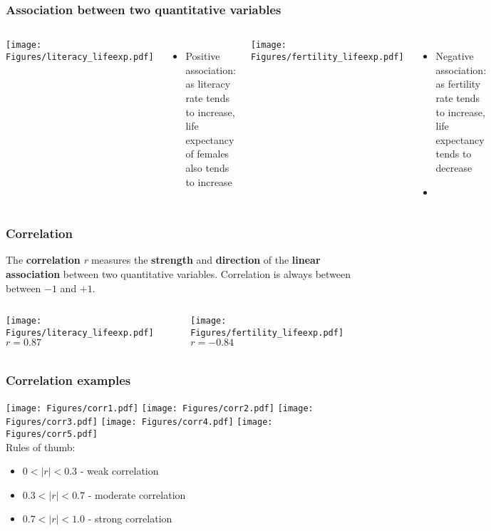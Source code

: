 \begin{frame}
\frametitle{Association between two quantitative variables}
\begin{columns}
\texttt{[image: Figures/literacy\_lifeexp.pdf]}\\
\begin{itemize}
    \item
    Positive association: as literacy rate tends to increase, life expectancy of females also tends to increase
\end{itemize}
\texttt{[image: Figures/fertility\_lifeexp.pdf]}\\
\begin{itemize}
    \item
    Negative association: as fertility rate tends to increase, life expectancy tends to decrease
    \item[]
\end{itemize}
\end{columns}
\end{frame}

\begin{frame}
\frametitle{Correlation}
The \textbf{correlation} \emph{r} measures the \textbf{strength} and \textbf{direction} of the \textbf{linear association} between two quantitative variables.  Correlation is always between between $-1$ and $+1$.
\begin{columns}
\begin{center}
\texttt{[image: Figures/literacy\_lifeexp.pdf]}\\
    $r=0.87$
\end{center}
\begin{center}
\texttt{[image: Figures/fertility\_lifeexp.pdf]}\\
    $r=-0.84$
\end{center}
\end{columns}
\end{frame}



\begin{frame}
\frametitle{Correlation examples}
\texttt{[image: Figures/corr1.pdf]}
\texttt{[image: Figures/corr2.pdf]}
\texttt{[image: Figures/corr3.pdf]}
\texttt{[image: Figures/corr4.pdf]}
\texttt{[image: Figures/corr5.pdf]}\\
\vskip10pt
Rules of thumb:
\begin{itemize}
    \item
    $0<|r|<0.3$ - weak correlation
    \item
    $0.3<|r|<0.7$ - moderate correlation
    \item
    $0.7<|r|<1.0$ - strong correlation
\end{itemize}
\end{frame}

